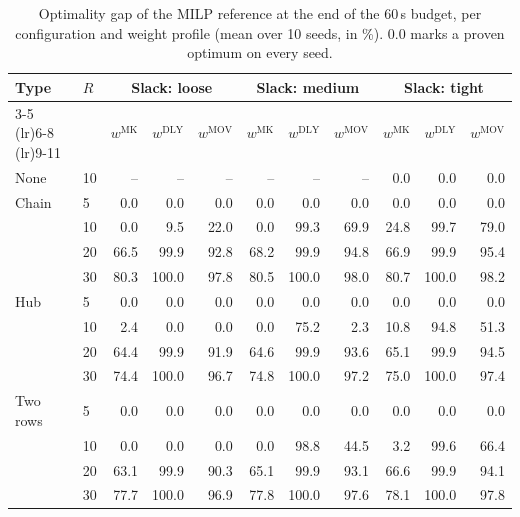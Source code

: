 \begin{table}[htbp]
  \centering
  \small
  \setlength{\tabcolsep}{4pt}
  \caption{Optimality gap of the MILP reference at the end of the 60\,s budget, per configuration and weight profile (mean over 10 seeds, in \%). $0.0$ marks a proven optimum on every seed.}
  \label{tab:milp_conv}
  \begin{tabular}{ll rrr rrr rrr}
    \toprule
    Type & $R$ & \multicolumn{3}{c}{Slack: loose} & \multicolumn{3}{c}{Slack: medium} & \multicolumn{3}{c}{Slack: tight} \\
    \cmidrule(lr){3-5} \cmidrule(lr){6-8} \cmidrule(lr){9-11}
     &  & $w^{\mathrm{MK}}$ & $w^{\mathrm{DLY}}$ & $w^{\mathrm{MOV}}$ & $w^{\mathrm{MK}}$ & $w^{\mathrm{DLY}}$ & $w^{\mathrm{MOV}}$ & $w^{\mathrm{MK}}$ & $w^{\mathrm{DLY}}$ & $w^{\mathrm{MOV}}$ \\
    \midrule
    None & 10 & -- & -- & -- & -- & -- & -- & 0.0 & 0.0 & 0.0 \\
    Chain & 5 & 0.0 & 0.0 & 0.0 & 0.0 & 0.0 & 0.0 & 0.0 & 0.0 & 0.0 \\
     & 10 & 0.0 & 9.5 & 22.0 & 0.0 & 99.3 & 69.9 & 24.8 & 99.7 & 79.0 \\
     & 20 & 66.5 & 99.9 & 92.8 & 68.2 & 99.9 & 94.8 & 66.9 & 99.9 & 95.4 \\
     & 30 & 80.3 & 100.0 & 97.8 & 80.5 & 100.0 & 98.0 & 80.7 & 100.0 & 98.2 \\
    Hub & 5 & 0.0 & 0.0 & 0.0 & 0.0 & 0.0 & 0.0 & 0.0 & 0.0 & 0.0 \\
     & 10 & 2.4 & 0.0 & 0.0 & 0.0 & 75.2 & 2.3 & 10.8 & 94.8 & 51.3 \\
     & 20 & 64.4 & 99.9 & 91.9 & 64.6 & 99.9 & 93.6 & 65.1 & 99.9 & 94.5 \\
     & 30 & 74.4 & 100.0 & 96.7 & 74.8 & 100.0 & 97.2 & 75.0 & 100.0 & 97.4 \\
    Two rows & 5 & 0.0 & 0.0 & 0.0 & 0.0 & 0.0 & 0.0 & 0.0 & 0.0 & 0.0 \\
     & 10 & 0.0 & 0.0 & 0.0 & 0.0 & 98.8 & 44.5 & 3.2 & 99.6 & 66.4 \\
     & 20 & 63.1 & 99.9 & 90.3 & 65.1 & 99.9 & 93.1 & 66.6 & 99.9 & 94.1 \\
     & 30 & 77.7 & 100.0 & 96.9 & 77.8 & 100.0 & 97.6 & 78.1 & 100.0 & 97.8 \\
    \bottomrule
  \end{tabular}
\end{table}
